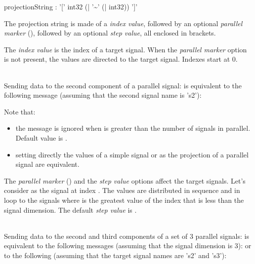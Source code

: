 \documentclass[a4paper,twoside]{report}
\newcommand{\sampleindent}	{ \hspace{0.5cm} }
\begin{document}

\begin{rail}
projectionString :  '[' int32 (| '\~{}' (| int32)) ']'
\end{rail}

The projection string is made of a \emph{index value}, followed by an optional \emph{parallel marker} (\OSC{\~{}}), followed by an optional \emph{step value}, all enclosed in brackets.

The \emph{index value}  is the index of a target signal. When the \emph{parallel marker} option is not present, the values are directed to the target signal. Indexes start at 0.

\example \\
Sending data to the second component of a parallel signal:
\sampleindent is equivalent to the following message (assuming that the second signal name is 's2'):

Note that:
\begin{itemize}
\item the message is ignored when  is greater than the number of signals in parallel. Default  value is . 
\item setting directly the values of a simple signal or as the projection of a parallel signal are equivalent.
\end{itemize}

The \emph{parallel marker} (\OSC{\~{}}) and the \emph{step value}  options affect the target signals. Let's consider  as the signal at index . The values are distributed in sequence and in loop to the signals  where  is the greatest value of the index  that is less than the signal dimension. The default  \emph{step value} is .

\example \\
Sending data to the second and third components of a set of 3 parallel signals:
\sampleindent is equivalent to the following messages (assuming that the signal dimension is 3):
\sampleindent or to the following (assuming that the target signal names are 's2' and 's3'):
\end{document}
